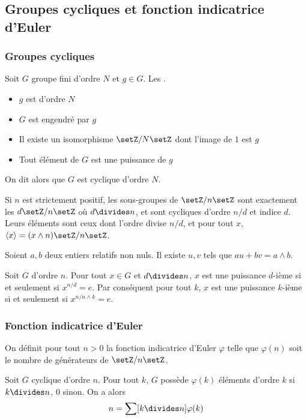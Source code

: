 \documentclass[a4paper,11pt,twocolumn]{article}
\begin{document}
  \subsection{Groupes cycliques et fonction indicatrice d'Euler}

    \subsubsection{Groupes cycliques}

       Soit $G$ groupe fini d'ordre $N$ et $g\in G$. Les \Asse{}.
      \begin{itemize}
        \item $g$ est d'ordre $N$
        \item $G$ est engendré par $g$
        \item Il existe un isomorphisme $\setZ/N\setZ$ dont l'image de $1$ est $g$
        \item Tout élément de $G$ est une puissance de $g$
      \end{itemize}

      On dit alors que $G$ est cyclique d'ordre $N$.

       Si $n$ est strictement positif, les sous-groupes de $\setZ/n\setZ$ sont exactement les $d\setZ/n\setZ$ où $d\divides n$, et sont cycliques d'ordre $n/d$ et indice $d$. Leurs éléments sont ceux dont l'ordre divise $n/d$, et pour tout $x$, $\langle x\rangle = (x\wedge n)\setZ/n\setZ$.

       Soient $a,b$ deux entiers relatifs non nuls. Il existe $u,v$ tels que $au+bv=a\wedge b$.

       Soit $G$ d'ordre $n$. Pour tout $x\in G$ et $d\divides n$, $x$ est une puissance $d$-ième si et seulement si $x^{n/d} = e$. Par conséquent pour tout $k$, $x$ est une puissance $k$-ième si et seulement si $x^{n/{n\wedge k}}=e$.

    \subsubsection{Fonction indicatrice d'Euler}

       On définit pour tout $n>0$ la fonction indicatrice d'Euler $\varphi$ telle que $\varphi(n)$ soit le nombre de générateurs de $\setZ/n\setZ$.

       Soit $G$ cyclique d'ordre $n$. Pour tout $k$, $G$ possède $\varphi(k)$ éléments d'ordre $k$ si $k\divides n$, $0$ sinon. On a alors $$n = \sum[k\divides n]{\varphi(k)}$$
\end{document}
